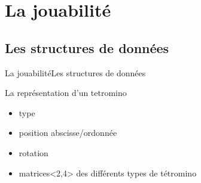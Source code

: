 \documentclass[french]{beamer}
\begin{document}
	\section{La jouabilité}
		\subsection{Les structures de données}

			\begin{frame}{La jouabilité}{Les structures de données}	

				\begin{block}{La représentation d'un tetromino}
					\begin{itemize}
						\item type
						\item position abscisse/ordonnée
						\item rotation
						\item matrices<2,4> des différents types de tétromino
					\end{itemize}
				\end{block}


\end{frame}
\end{document}
